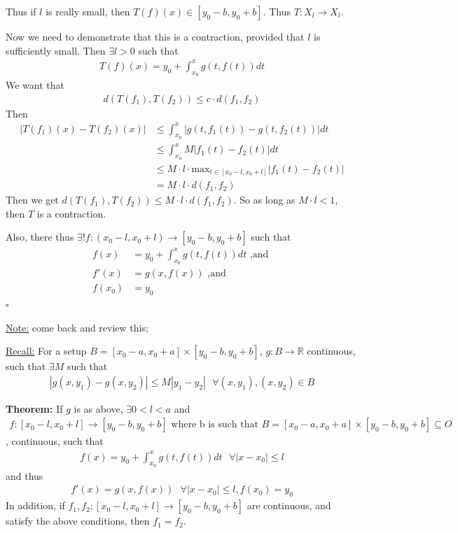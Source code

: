 \documentclass{article}
\newcommand*{\qed}{\hfill$\square$}%
\newcommand*{\txt}[1]{\text{ #1 }}%
\newcommand*{\fora}{\txt{}\forall}%
\newcommand*{\rr}{\mathbb{R}}%
\begin{document}
Thus if $l$ is really small, then $T(f)(x)\in [y_0-b,y_0+b]$. Thus $T:X_l\to X_l$.

Now we need to demonstrate that this is a contraction, provided that $l$ is sufficiently small. Then $\exists l>0$ such that \begin{align*}
    T(f)(x)=y_0+\int_{x_0}^{x}g(t,f(t))dt
\end{align*}
We want that \begin{align*}
    d(T(f_1),T(f_2))\leq c\cdot d(f_1,f_2)
\end{align*}
Then \begin{align*}
    |T(f_1)(x)-T(f_2)(x)|&\leq \int_{x_0}^{x}|g(t,f_1(t))-g(t,f_2(t))|dt\\
    &\leq \int_{x_0}^{x}M|f_1(t)-f_2(t)|dt\\
    &\leq M\cdot l\cdot\text{max}_{t\in[x_0-l,x_0+l]}|f_1(t)-f_2(t)|\\
    &=M\cdot l\cdot d(f_1,f_2)
\end{align*}
Then we get $d(T(f_1),T(f_2))\leq M\cdot l\cdot d(f_1,f_2)$. So as long as $M\cdot l<1$, then $T$ is a contraction.

Also, there thus $\exists! f:(x_0-l,x_0+l)\to [y_0-b,y_0+b]$ such that \begin{align*}
    f(x)&=y_0+\int_{x_0}^{x}g(t,f(t))dt\txt{,and}\\
    f'(x)&=g(x,f(x))\txt{,and}\\
    f(x_0)&=y_0
\end{align*} \qed

\underline{Note:} come back and review this;

\underline{Recall:} For a setup $B=[x_0-a,x_0+a]\times [y_0-b,y_0+b]$, $g:B\to \rr$ continuous, such that $\exists M$ such that \begin{align*}
    |g(x,y_1)-g(x,y_2)|\leq M|y_1-y_2|\fora (x,y_1),(x,y_2)\in B
\end{align*}

\textbf{Theorem:} If $g$ is as above, $\exists 0<l<a$ and \begin{align*}
    f:[x_0-l,x_0+l]\to [y_0-b,y_0+b]\txt{where b is such that}B=[x_0-a,x_0+a]\times[y_0-b,y_0+b]\subseteq O
\end{align*}, continuous, such that \begin{align*}
    f(x)=y_0+\int_{x_0}^{x}g(t,f(t))dt\fora |x-x_0|\leq l
\end{align*} and thus \begin{align*}
    f'(x)=g(x,f(x))\fora |x-x_0|\leq l,f(x_0)=y_0
\end{align*} In addition, if $f_1,f_2:[x_0-l,x_0+l]\to[y_0-b,y_0+b]$ are continuous, and satisfy the above conditions, then $f_1=f_2$.
\end{document}
